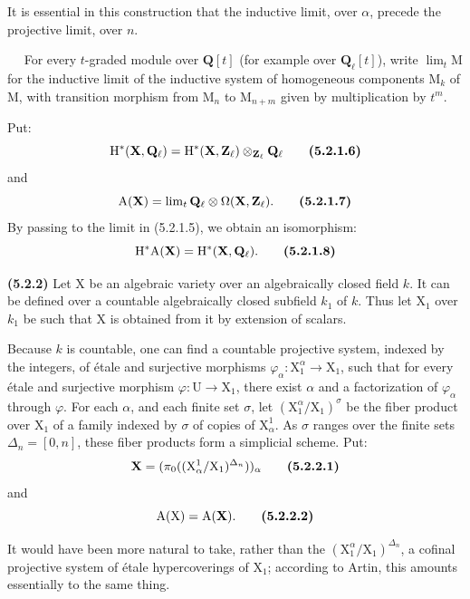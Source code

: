 \documentclass[11pt,leqno]{article}
\newcommand{\Page}[1]{\ifvmode\noindent\else\unskip\ \fi{\footnotesize\textcolor{gray}{[p.\,#1]}}\ \ignorespaces}
\begin{document}
It is essential in this construction that the inductive limit, over \(\alpha\), precede the projective limit, over \(n\).

\Page{238}
For every \(t\)-graded module over \(\mathbf{Q}[t]\) (for example over \(\mathbf{Q}_{\ell}[t]\)), write \(\lim\nolimits_t\mathrm{M}\) for the inductive limit of the inductive system of homogeneous components \(\mathrm{M}_k\) of \(\mathrm{M}\), with transition morphism from \(\mathrm{M}_n\) to \(\mathrm{M}_{n+m}\) given by multiplication by \(t^m\).

Put:
\[
\mathrm{H}^*(\mathbf{X},\mathbf{Q}_{\ell})
=\mathrm{H}^*(\mathbf{X},\mathbf{Z}_{\ell})
\otimes_{\mathbf{Z}_{\ell}}\mathbf{Q}_{\ell}
\tag*{\textbf{(5.2.1.6)}}
\]
and
\[
\mathrm{A}(\mathbf{X})
=\lim\nolimits_t\mathbf{Q}_{\ell}\otimes\Omega(\mathbf{X},\mathbf{Z}_{\ell}).
\tag*{\textbf{(5.2.1.7)}}
\]
By passing to the limit in (5.2.1.5), we obtain an isomorphism:
\[
\mathrm{H}^*\mathrm{A}(\mathbf{X})=\mathrm{H}^*(\mathbf{X},\mathbf{Q}_{\ell}).
\tag*{\textbf{(5.2.1.8)}}
\]

\textbf{(5.2.2)} Let \(\mathrm{X}\) be an algebraic variety over an algebraically closed field \(k\). It can be defined over a countable algebraically closed subfield \(k_1\) of \(k\). Thus let \(\mathrm{X}_1\) over \(k_1\) be such that \(\mathrm{X}\) is obtained from it by extension of scalars.

Because \(k\) is countable, one can find a countable projective system, indexed by the integers, of étale and surjective morphisms \(\varphi_{\alpha}:\mathrm{X}_1^{\alpha}\to\mathrm{X}_1\), such that for every étale and surjective morphism \(\varphi:\mathrm{U}\to\mathrm{X}_1\), there exist \(\alpha\) and a factorization of \(\varphi_{\alpha}\) through \(\varphi\). For each \(\alpha\), and each finite set \(\sigma\), let \((\mathrm{X}_1^{\alpha}/\mathrm{X}_1)^{\sigma}\) be the fiber product over \(\mathrm{X}_1\) of a family indexed by \(\sigma\) of copies of \(\mathrm{X}_{\alpha}^{1}\). As \(\sigma\) ranges over the finite sets \(\Delta_n=[0,n]\), these fiber products form a simplicial scheme. Put:
\[
\mathbf{X}=(\pi_0((\mathrm{X}_{\alpha}^{1}/\mathrm{X}_1)^{\Delta_n}))_{\alpha}
\tag*{\textbf{(5.2.2.1)}}
\]
and
\[
\mathrm{A}(\mathrm{X})=\mathrm{A}(\mathbf{X}).
\tag*{\textbf{(5.2.2.2)}}
\]

It would have been more natural to take, rather than the \((\mathrm{X}_1^{\alpha}/\mathrm{X}_1)^{\Delta_n}\), a cofinal projective system of étale hypercoverings of \(\mathrm{X}_1\); according to Artin, this amounts essentially to the same thing.
\end{document}
